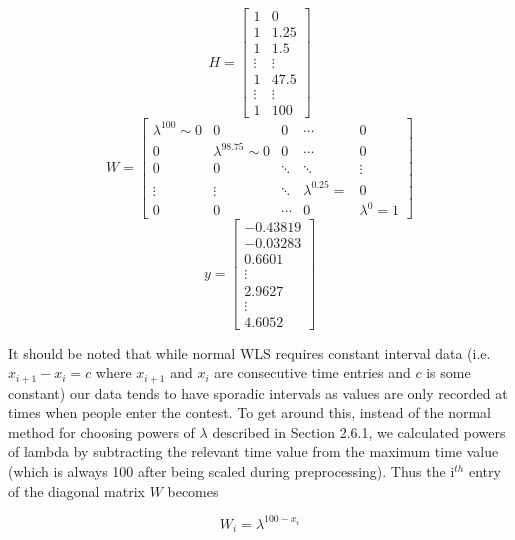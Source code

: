 \begin{equation}
    H = \begin{bmatrix}
        1 & 0 \\
        1 & 1.25 \\
        1 & 1.5 \\
        \vdots & \vdots \\
        1 & 47.5 \\
        \vdots & \vdots \\
        1 & 100 
    \end{bmatrix}
\end{equation}
\begin{equation}
    W = \begin{bmatrix}
        \lambda^{100}\sim 0 & 0 & 0 & \cdots & 0 \\
        0 & \lambda^{98.75}\sim 0 & 0 & \cdots & 0 \\
        0 & 0 & \ddots & \ddots  & \vdots  \\
        \vdots & \vdots & \ddots & \lambda^{0.25} =  & 0  \\
        0 & 0 & \cdots & 0 & \lambda^{0} = 1 
    \end{bmatrix}
\end{equation}
\begin{equation}
    y = \begin{bmatrix}
        -0.43819 \\ 
        -0.03283 \\ 
        0.6601 \\
        \vdots \\ 
        2.9627 \\
        \vdots \\
        4.6052
    \end{bmatrix}
\end{equation}

It should be noted that while normal WLS requires constant interval data (i.e. $x_{i+1} - x_{i} = c$ where $x_{i+1}$ and $x_{i}$ are consecutive time entries and $c$ is some constant) our data tends to have sporadic intervals as values are only recorded at times when people enter the contest. To get around this, instead of the normal method for choosing powers of $\lambda$ described in Section 2.6.1, we calculated powers of lambda by subtracting the relevant time value from the maximum time value (which is always 100 after being scaled during preprocessing). Thus the i$^{th}$ entry of the diagonal matrix $W$ becomes

\begin {equation}
    W_{i} = \lambda^{100 - x_{i}}
\end{equation}


